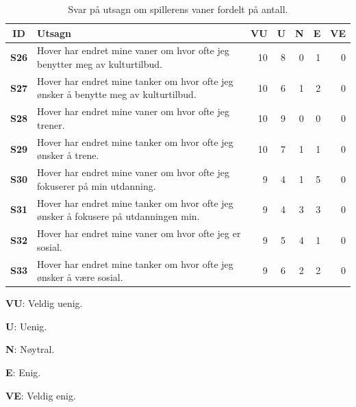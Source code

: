 \begin{table}[H]     
    \small
    
    \begin{threeparttable}[t]
    \begin{tabularx}{\textwidth}{|>{\bfseries}c|X|r|r|r|r|r|}
        \hline \textbf{ID} &  \textbf{Utsagn} & \textbf{VU }  &  \textbf{U}  &  \textbf{N}  &  \textbf{E}  &  \textbf{VE}  \\ \hline
        S26 & Hover har endret mine vaner om hvor ofte jeg benytter meg av kulturtilbud.  & 10 & 8 & 0 & 1 & 0 \\ 
        S27 & Hover har endret mine tanker om hvor ofte jeg ønsker å benytte meg av kulturtilbud.  & 10 & 6 & 1 & 2 & 0 \\ 
        S28 & Hover har endret mine vaner om hvor ofte jeg trener.  & 10 & 9 & 0 & 0 & 0 \\ 
        S29 & Hover har endret mine tanker om hvor ofte jeg ønsker å trene.  & 10 & 7 & 1 & 1 & 0 \\ 
        S30 & Hover har endret mine vaner om hvor ofte jeg fokuserer på min utdanning.  & 9 & 4 & 1 & 5 & 0 \\ 
        S31 & Hover har endret mine tanker om hvor ofte jeg ønsker å fokusere på utdanningen min.  & 9 & 4 & 3 & 3 & 0 \\ 
        S32 & Hover har endret mine vaner om hvor ofte jeg er sosial.  & 9 & 5 & 4 & 1 & 0 \\ 
        S33 & Hover har endret mine tanker om hvor ofte jeg ønsker å være sosial.  & 9 & 6 & 2 & 2 & 0 \\
         \hline
    \end{tabularx}
    \begin{tablenotes}
    \scriptsize
     \item[] \textbf{VU}: Veldig uenig.
     \item[] \textbf{U}: Uenig.
     \item[] \textbf{N}: Nøytral.
     \item[] \textbf{E}: Enig.
     \item[] \textbf{VE}: Veldig enig.
   \end{tablenotes}
   \end{threeparttable}
   \caption{Svar på utsagn om spillerens vaner fordelt på antall.}
\end{table}

